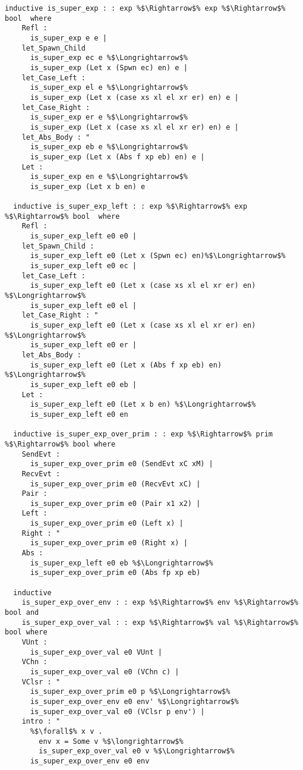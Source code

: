 \documentclass{article}
\begin{document}
\begin{lstlisting}[style=codestyle1, escapechar=\%]
  inductive is_super_exp : : exp %$\Rightarrow$% exp %$\Rightarrow$% bool  where
    Refl :
      is_super_exp e e | 
    let_Spawn_Child
      is_super_exp ec e %$\Longrightarrow$%
      is_super_exp (Let x (Spwn ec) en) e |
    let_Case_Left :
      is_super_exp el e %$\Longrightarrow$%
      is_super_exp (Let x (case xs xl el xr er) en) e |
    let_Case_Right :
      is_super_exp er e %$\Longrightarrow$%
      is_super_exp (Let x (case xs xl el xr er) en) e |
    let_Abs_Body : "
      is_super_exp eb e %$\Longrightarrow$%
      is_super_exp (Let x (Abs f xp eb) en) e | 
    Let :
      is_super_exp en e %$\Longrightarrow$%
      is_super_exp (Let x b en) e

  inductive is_super_exp_left : : exp %$\Rightarrow$% exp %$\Rightarrow$% bool  where
    Refl :
      is_super_exp_left e0 e0 | 
    let_Spawn_Child :
      is_super_exp_left e0 (Let x (Spwn ec) en)%$\Longrightarrow$%
      is_super_exp_left e0 ec |
    let_Case_Left :
      is_super_exp_left e0 (Let x (case xs xl el xr er) en) %$\Longrightarrow$%
      is_super_exp_left e0 el |
    let_Case_Right : "
      is_super_exp_left e0 (Let x (case xs xl el xr er) en) %$\Longrightarrow$%
      is_super_exp_left e0 er |
    let_Abs_Body :
      is_super_exp_left e0 (Let x (Abs f xp eb) en) %$\Longrightarrow$%
      is_super_exp_left e0 eb | 
    Let :
      is_super_exp_left e0 (Let x b en) %$\Longrightarrow$%
      is_super_exp_left e0 en

  inductive is_super_exp_over_prim : : exp %$\Rightarrow$% prim %$\Rightarrow$% bool where
    SendEvt :
      is_super_exp_over_prim e0 (SendEvt xC xM) |
    RecvEvt :
      is_super_exp_over_prim e0 (RecvEvt xC) |
    Pair :
      is_super_exp_over_prim e0 (Pair x1 x2) |
    Left :
      is_super_exp_over_prim e0 (Left x) |
    Right : "
      is_super_exp_over_prim e0 (Right x) |
    Abs :
      is_super_exp_left e0 eb %$\Longrightarrow$%
      is_super_exp_over_prim e0 (Abs fp xp eb) 

  inductive 
    is_super_exp_over_env : : exp %$\Rightarrow$% env %$\Rightarrow$% bool and
    is_super_exp_over_val : : exp %$\Rightarrow$% val %$\Rightarrow$% bool where
    VUnt :
      is_super_exp_over_val e0 VUnt |
    VChn :
      is_super_exp_over_val e0 (VChn c) |
    VClsr : "
      is_super_exp_over_prim e0 p %$\Longrightarrow$%
      is_super_exp_over_env e0 env' %$\Longrightarrow$%
      is_super_exp_over_val e0 (VClsr p env') |
    intro : "
      %$\forall$% x v .
        env x = Some v %$\longrightarrow$%
        is_super_exp_over_val e0 v %$\Longrightarrow$%
      is_super_exp_over_env e0 env


\end{lstlisting}
\end{document}
